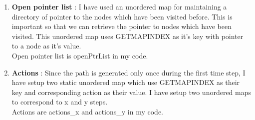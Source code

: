 \documentclass[12pt]{article}
\begin{document}
\begin{enumerate}
    \item \textbf{Open pointer list} : I have used an unordered map for maintaining a directory of pointer to the nodes which have been visited before. This is important so that we can retrieve the pointer to nodes which have been visited. This unordered map uses GETMAPINDEX as it's key with pointer to a node as it's value.\\
    Open pointer list is openPtrList in my code.
    
    \item \textbf{Actions} : Since the path is generated only once during the first time step, I have setup two static unordered map which use GETMAPINDEX as their key and corresponding action as their value. I have setup two unordered maps to correspond to x and y steps.\\
    Actions are actions\_x and actions\_y in my code.
\end{enumerate}
\end{document}
